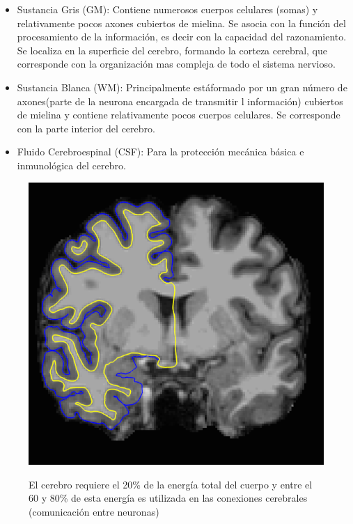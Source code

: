 \begin{itemize}
	\item Sustancia Gris (GM): Contiene numerosos cuerpos celulares (somas) y relativamente pocos axones cubiertos de mielina. Se asocia con la función del procesamiento de la información, es decir con la capacidad del razonamiento. Se localiza en la superficie del cerebro, formando la corteza cerebral, que corresponde con la organización mas compleja de todo el sistema nervioso.
	\item Sustancia Blanca (WM): Principalmente estáformado por un gran número de axones(parte de la neurona encargada de transmitir l información) cubiertos de mielina y contiene relativamente pocos cuerpos celulares. Se corresponde con la parte interior del cerebro.
	\item Fluido Cerebroespinal (CSF): Para la protección mecánica básica e inmunológica del cerebro.
\end{itemize} 

\begin{figure}[H]
  \centering
    \includegraphics[scale=0.60]{img/tejidos.png}\label{eda:tejidos}
  \caption{El cerebro requiere el 20\% de la energía total del cuerpo y entre el 60 y 80\% de esta energía es utilizada en las conexiones cerebrales (comunicación entre neuronas)}
\end{figure}

\cite{brainhack}

